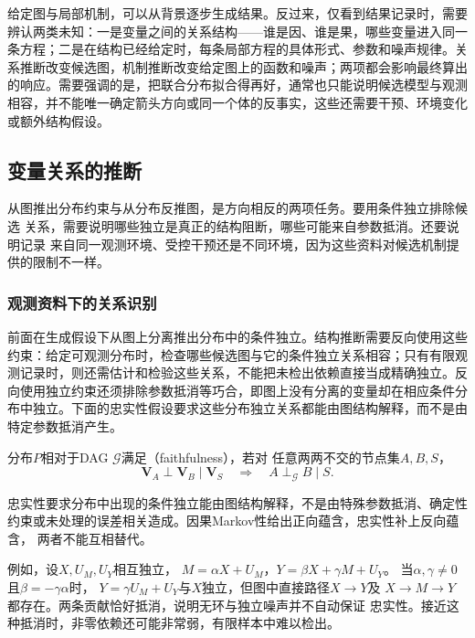 给定图与局部机制，可以从背景逐步生成结果。反过来，仅看到结果记录时，需要辨认两类未知：一是变量之间的关系结构——谁是因、谁是果，哪些变量进入同一条方程；二是在结构已经给定时，每条局部方程的具体形式、参数和噪声规律。关系推断改变候选图，机制推断改变给定图上的函数和噪声；两项都会影响最终算出的响应。需要强调的是，把联合分布拟合得再好，通常也只能说明候选模型与观测相容，并不能唯一确定箭头方向或同一个体的反事实，这些还需要干预、环境变化或额外结构假设。

\subsection{变量关系的推断}
\label{sec:causal-relation-inference}

从图推出分布约束与从分布反推图，是方向相反的两项任务。要用条件独立排除候选
关系，需要说明哪些独立是真正的结构阻断，哪些可能来自参数抵消。还要说明记录
来自同一观测环境、受控干预还是不同环境，因为这些资料对候选机制提供的限制不一样。

\subsubsection{观测资料下的关系识别}
\label{sec:causal-observational-structure}

前面在生成假设下从图上分离推出分布中的条件独立。结构推断需要反向使用这些约束：给定可观测分布时，检查哪些候选图与它的条件独立关系相容；只有有限观测记录时，则还需估计和检验这些关系，不能把未检出依赖直接当成精确独立。反向使用独立约束还须排除参数抵消等巧合，即图上没有分离的变量却在相应条件分布中独立。下面的忠实性假设要求这些分布独立关系都能由图结构解释，而不是由特定参数抵消产生。
\begin{definition}[相对于DAG的忠实性]
  \label{def:causal-faithfulness}
  分布\(P\)相对于DAG \(\mathcal G\)满足（faithfulness），若对
  任意两两不交的节点集\(A,B,S\)，
  \[
    \bm V_A\perp\bm V_B\mid\bm V_S
    \quad\Longrightarrow\quad
    A\perp_{\mathcal G}B\mid S.
  \]
\end{definition}
忠实性要求分布中出现的条件独立能由图结构解释，不是由特殊参数抵消、确定性
约束或未处理的误差相关造成。因果Markov性给出正向蕴含，忠实性补上反向蕴含，
两者不能互相替代。

例如，设\(X,U_M,U_Y\)相互独立，
\(M=\alpha X+U_M\)，\(Y=\beta X+\gamma M+U_Y\)。
当\(\alpha,\gamma\ne0\)且\(\beta=-\gamma\alpha\)时，
\(Y=\gamma U_M+U_Y\)与\(X\)独立，但图中直接路径\(X\to Y\)及
\(X\to M\to Y\)都存在。两条贡献恰好抵消，说明无环与独立噪声并不自动保证
忠实性。接近这种抵消时，非零依赖还可能非常弱，有限样本中难以检出。

